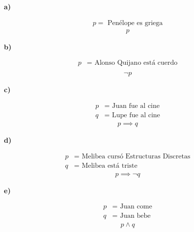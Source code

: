 \textbf{a)}
\vspace{-10px}
\begin{multicols}{2}
    \noindent
    \begin{gather*}
        p = \text{ Penélope es griega}
    \end{gather*}
    \columnbreak
    \begin{gather*}
        p 
    \end{gather*}
\end{multicols}
\textbf{b)}
\vspace{-10px}
\begin{multicols}{2}
    \noindent
    \begin{align*}
        p &= \text{ Alonso Quijano está cuerdo}\\
    \end{align*}
    \columnbreak
    \begin{align*}
        \neg p
    \end{align*}
\end{multicols}
\textbf{c)}
\vspace{-10px}
\begin{multicols}{2}
    \noindent
    \begin{align*}
        p &= \text{ Juan fue al cine}\\
        q &= \text{ Lupe fue al cine}
    \end{align*}
    \columnbreak
    \begin{align*}
        p\implies q
    \end{align*}
\end{multicols}
\textbf{d)}
\vspace{-10px}
\begin{multicols}{2}
    \noindent
    \begin{align*}
        p &= \text{ Melibea cursó Estructuras Discretas}\\
        q &= \text{ Melibea está triste}
    \end{align*}
    \columnbreak
    \begin{align*}
        p\implies \neg q
    \end{align*}
\end{multicols}
\textbf{e)}
\vspace{-10px}
\begin{multicols}{2}
    \noindent
    \begin{align*}
        p &= \text{ Juan come}\\
        q &= \text{ Juan bebe}
    \end{align*}
    \columnbreak
    \begin{align*}
        p\land  q
    \end{align*}
\end{multicols}
